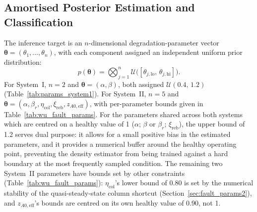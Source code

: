 \documentclass[aps,pre,twocolumn,superscriptaddress,floatfix]{revtex4-2}
\begin{document}
\subsection{Amortised Posterior Estimation and Classification}
\label{sec:sbi_method}

The inference target is an $n$-dimensional degradation-parameter vector $\boldsymbol{\theta}=(\theta_1,\ldots,\theta_n)$, with each component
assigned an independent uniform prior distribution:
%
\begin{equation}
  p(\boldsymbol{\theta}) =
  \bigotimes_{j=1}^{n}
  \mathcal{U}\!\bigl([\theta_{j,\mathrm{lo}},\,\theta_{j,\mathrm{hi}}]\bigr).
  \label{eq:prior}
\end{equation}
%
For System~I, $n=2$ and $\boldsymbol{\theta}=(\alpha,\beta)$, both assigned
$\mathcal{U}(0.4,\,1.2)$ (Table~\ref{tab:params_system1}). For System~II,
$n=5$ and
$\boldsymbol{\theta}=(\alpha,\beta_r,\eta_\mathrm{col},\xi_\mathrm{reb},z_{A0,\mathrm{eff}})$,
with per-parameter bounds given in Table~\ref{tab:wu_fault_params}.
For the parameters shared across both systems which are centred on a healthy value of 1 ($\alpha$; $\beta$ or $\beta_r$; $\xi_\mathrm{reb}$), the upper bound of 1.2 serves dual purpose: it allows for a small positive bias in the estimated parameters, and it provides a numerical buffer around the healthy operating point, preventing the density estimator from being trained against a hard boundary at the most frequently sampled condition. The remaining two System~II parameters have bounds set by other constraints (Table~\ref{tab:wu_fault_params}): $\eta_\mathrm{col}$'s lower bound of 0.80 is set by the numerical stability of the quasi-steady-state column shortcut (Section~\ref{sec:fault_params2}), and $z_{A0,\mathrm{eff}}$'s bounds are centred on its own healthy value of 0.90, not 1.
\end{document}
